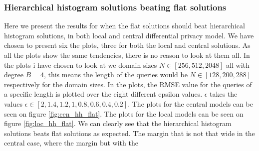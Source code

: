 \documentclass[11pt]{article}
\theoremstyle{definition}
\begin{document}
\subsubsection{Hierarchical histogram solutions beating flat solutions}
Here we present the results for when the flat solutions should beat hierarchical histogram solutions, in both local and central differential privacy model. We have chosen to present six the plots, three for both the local and central solutions. As all the plots show the same tendencies, there is no reason to look at them all. In the plots i have chosen to look at we domain sizes $N\in[256,512,2048]$ all with degree $B=4$, this means the length of the queries would be $N\in[128, 200, 288]$ respectively for the domain sizes. In the plots, the RMSE value for the queries of a specific length is plotted over the eight different epsilon values. $\epsilon$ takes the values $\epsilon\in[2, 1.4, 1.2, 1, 0.8, 0.6, 0.4, 0.2]$.  The plots for the central models can be seen on figure \ref{fig:cen_hh_flat}. The plots for the local models can be seen on figure \ref{fig:loc_hh_flat}. We can clearly see that the hierarchical histogram solutions  beats flat solutions as expected. The margin that is not that wide in the central case, where the margin but with the 
\end{document}
